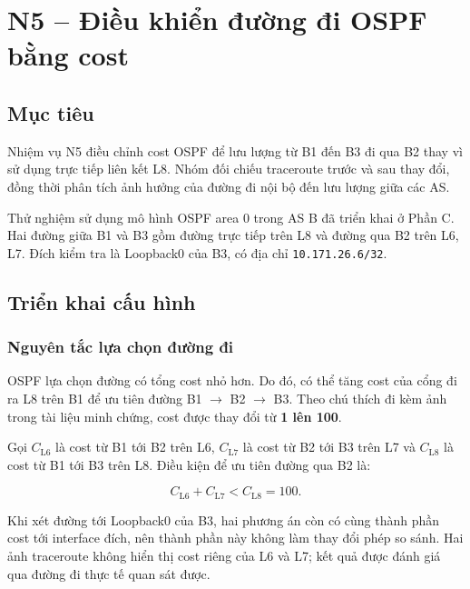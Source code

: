 
\section{N5 -- Điều khiển đường đi OSPF bằng cost}
\label{sec:N5}

\subsection{Mục tiêu}

Nhiệm vụ N5 điều chỉnh cost OSPF để lưu lượng từ B1
đến B3 đi qua B2 thay vì sử dụng trực tiếp liên kết L8.
Nhóm đối chiếu traceroute trước và sau thay đổi,
đồng thời phân tích ảnh hưởng của đường đi nội bộ
đến lưu lượng giữa các AS.

Thử nghiệm sử dụng mô hình OSPF area 0 trong AS B
đã triển khai ở Phần C. Hai đường giữa B1 và B3 gồm
đường trực tiếp trên L8 và đường qua B2 trên L6, L7.
Đích kiểm tra là Loopback0 của B3, có địa chỉ
\texttt{10.171.26.6/32}.

\subsection{Triển khai cấu hình}

\subsubsection{Nguyên tắc lựa chọn đường đi}

OSPF lựa chọn đường có tổng cost nhỏ hơn.
Do đó, có thể tăng cost của cổng đi ra L8 trên B1
để ưu tiên đường B1 $\rightarrow$ B2 $\rightarrow$ B3.
Theo chú thích đi kèm ảnh trong tài liệu minh chứng,
cost được thay đổi từ \textbf{1 lên 100}.

Gọi $C_{\text{L6}}$ là cost từ B1 tới B2 trên L6,
$C_{\text{L7}}$ là cost từ B2 tới B3 trên L7 và
$C_{\text{L8}}$ là cost từ B1 tới B3 trên L8.
Điều kiện để ưu tiên đường qua B2 là:

\begin{equation}
C_{\text{L6}} + C_{\text{L7}} < C_{\text{L8}} = 100.
\end{equation}

Khi xét đường tới Loopback0 của B3,
hai phương án còn có cùng thành phần cost tới interface đích,
nên thành phần này không làm thay đổi phép so sánh.
Hai ảnh traceroute không hiển thị cost riêng của L6 và L7;
kết quả được đánh giá qua đường đi thực tế quan sát được.

